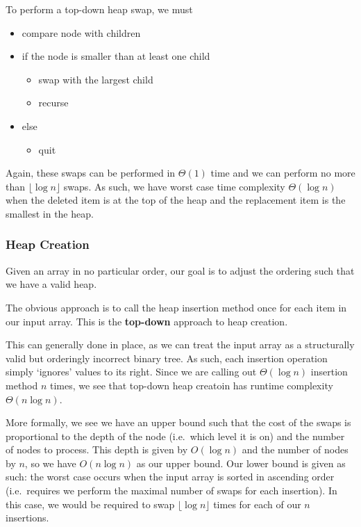 \documentclass[12pt]{article}
\begin{document}
To perform a top-down heap swap, we must
\begin{itemize}
\item compare node with children
\item if the node is smaller than at least one child
\begin{itemize}
\item swap with the largest child
\item recurse
\end{itemize}
\item else
\begin{itemize}
\item quit
\end{itemize}
\end{itemize}

Again, these swaps can be performed in $\Theta(1)$ time and we can perform no more than $\lfloor\log n\rfloor$ swaps. As such, we have worst case time complexity $\Theta(\log n)$ when the deleted item is at the top of the heap and the replacement item is the smallest in the heap.

\subsubsection{Heap Creation}
Given an array in no particular order, our goal is to adjust the ordering such that we have a valid heap.

The obvious approach is to call the heap insertion method once for each item in our input array. This is the {\bf top-down} approach to heap creation.

This can generally done in place, as we can treat the input array as a structurally valid but orderingly incorrect binary tree. As such, each insertion operation simply `ignores' values to its right. Since we are calling out $\Theta(\log n)$ insertion method $n$ times, we see that top-down heap creatoin has runtime complexity $\Theta(n\log n)$.

More formally, we see we have an upper bound such that the cost of the swaps is proportional to the depth of the node (i.e.\ which level it is on) and the number of nodes to process. This depth is given by $O(\log n)$ and the number of nodes by $n$, so we have $O(n\log n)$ as our upper bound. Our lower bound is given as such: the worst case occurs when the input array is sorted in ascending order (i.e.\ requires we perform the maximal number of swaps for each insertion). In this case, we would be required to swap $\lfloor\log n\rfloor$ times for each of our $n$ insertions.
\end{document}
